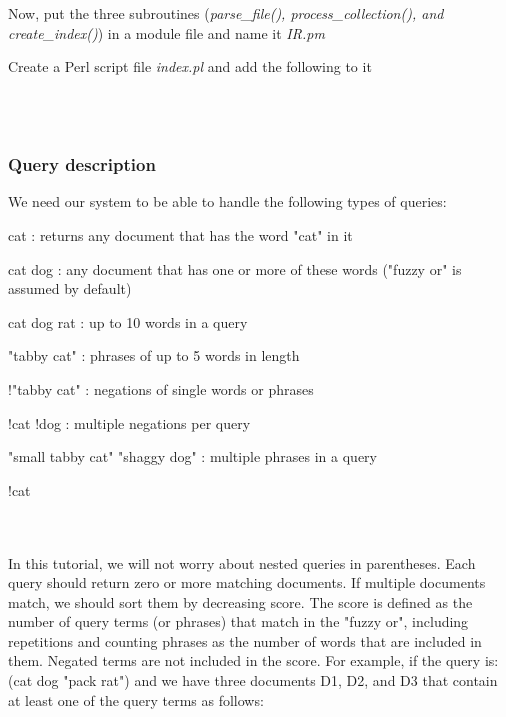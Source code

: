 \\
\\
Now, put the three subroutines (\emph{parse\_file(), process\_collection(), and create\_index()}) in a module file and name it \emph{IR.pm}

Create a Perl script file \emph{index.pl} and add the following to it
\\
\\
\\

\subsubsection{Query description}
We need our system to be able to handle the following types of queries:
\\
\begin{boxedverbatim}
cat          : returns any document that has the word "cat" in it

cat dog      : any document that has one or more of these words
           ("fuzzy or" is assumed by default)

cat dog rat  : up to 10 words in a query

"tabby cat"  : phrases of up to 5 words in length

!"tabby cat" : negations of single words or phrases

!cat !dog    : multiple negations per query

"small tabby cat" "shaggy dog" : multiple phrases in a query

!cat
\end{boxedverbatim}    
\\
\\
In this tutorial, we will not worry about nested queries in parentheses. Each query should return zero or more matching documents. If multiple documents match, we should sort them by decreasing score. The score is defined as the number of query terms (or phrases) that match in the "fuzzy or", including repetitions and counting phrases as the number of words that are included in them. Negated terms are not included in the score. For example, if the query is: (cat dog "pack rat") and we have three documents D1, D2, and D3 that contain at least one of the query terms as follows:

